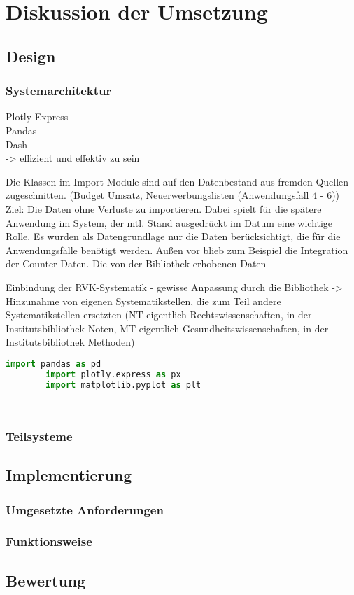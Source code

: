 \chapter{Diskussion der Umsetzung}
\label{chap:five}
\section{Design}
    \subsection{Systemarchitektur}
    Plotly Express\\
    Pandas\\
    Dash\\
    -> effizient und effektiv zu sein


Die Klassen im Import Module sind auf den Datenbestand aus fremden Quellen zugeschnitten.
(Budget Umsatz, Neuerwerbungslisten (Anwendungsfall 4 - 6))
Ziel: Die Daten ohne Verluste zu importieren. Dabei spielt für die spätere Anwendung im System, der mtl. Stand
ausgedrückt im Datum eine wichtige Rolle.
Es wurden als Datengrundlage nur die Daten berücksichtigt, die für die Anwendungsfälle benötigt werden.
Außen vor blieb zum Beispiel die Integration der Counter-Daten.
Die von der Bibliothek erhobenen Daten

Einbindung der RVK-Systematik - gewisse Anpassung durch die Bibliothek -> Hinzunahme von eigenen Systematikstellen,
die zum Teil andere Systematikstellen ersetzten (NT eigentlich Rechtswissenschaften, in der Institutsbibliothek Noten, MT eigentlich
Gesundheitswissenschaften, in der Institutsbibliothek Methoden)

    \begin{lstlisting}[language=Python, caption=Python example]
        import pandas as pd
        import plotly.express as px
        import matplotlib.pyplot as plt

        
    \end{lstlisting}

    \subsection{Teilsysteme}

\section{Implementierung}
    \subsection{Umgesetzte Anforderungen}
    \subsection{Funktionsweise}

\section{Bewertung}